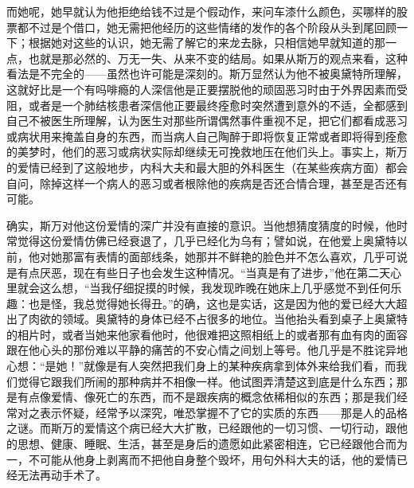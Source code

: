 \par 而她呢，她早就认为他拒绝给钱不过是个假动作，来问车漆什么颜色，买哪样的股票都不过是个借口，她无需把他经历的这些情绪的发作的各个阶段从头到尾回顾一下；根据她对这些的认识，她无需了解它的来龙去脉，只相信她早就知道的那一点，也就是那必然的、万无一失、从来不变的结局。如果从斯万的观点来看，这种看法是不完全的——虽然也许可能是深刻的。斯万显然认为他不被奥黛特所理解，这就好比是一个有吗啡瘾的人深信他是正要摆脱他的顽固恶习时由于外界因素而受阻，或者是一个肺结核患者深信他正要最终痊愈时突然遭到意外的不适，全都感到自己不被医生所理解，认为医生对那些所谓偶然事件重视不足，把它们都看成恶习或病状用来掩盖自身的东西，而当病人自己陶醉于即将恢复正常或者即将得到痊愈的美梦时，他们的恶习或病状实际却继续无可挽救地压在他们头上。事实上，斯万的爱情已经到了这般地步，内科大夫和最大胆的外科医生（在某些疾病方面）都会自问，除掉这样一个病人的恶习或者根除他的疾病是否还合情合理，甚至是否还有可能。
\par 确实，斯万对他这份爱情的深广并没有直接的意识。当他想猜度猜度的时候，他时常觉得这份爱情仿佛已经衰退了，几乎已经化为乌有；譬如说，在他爱上奥黛特以前，他对她那富有表情的面部线条，她那并不鲜艳的脸色并不怎么喜欢，几乎可说是有点厌恶，现在有些日子也会发生这种情况。“当真是有了进步，”他在第二天心里就会这么想，“当我仔细捉摸的时候，我发现昨晚在她床上几乎感觉不到任何乐趣：也是怪，我总觉得她长得丑。”的确，这也是实话，这是因为他的爱已经大大超出了肉欲的领域。奥黛特的身体已经不占很多的地位。当他抬头看到桌子上奥黛特的相片时，或者当她来他家看他时，他很难把这照相纸上的或者那有血有肉的面容跟在他心头的那份难以平静的痛苦的不安心情之间划上等号。他几乎是不胜诧异地心想：“是她！”就像是有人突然把我们身上的某种疾病拿到体外来给我们看，而我们觉得它跟我们所闹的那种病并不相像一样。他试图弄清楚这到底是什么东西；那是有点像爱情、像死亡的东西，而不是跟疾病的概念依稀相似的东西；那是我们经常对之表示怀疑，经常予以深究，唯恐掌握不了它的实质的东西——那是人的品格之谜。而斯万的爱情这个病已经大大扩散，已经跟他的一切习惯、一切行动，跟他的思想、健康、睡眠、生活，甚至是身后的遗愿如此紧密相连，它已经跟他合而为一，不可能从他身上剥离而不把他自身整个毁坏，用句外科大夫的话，他的爱情已经无法再动手术了。
